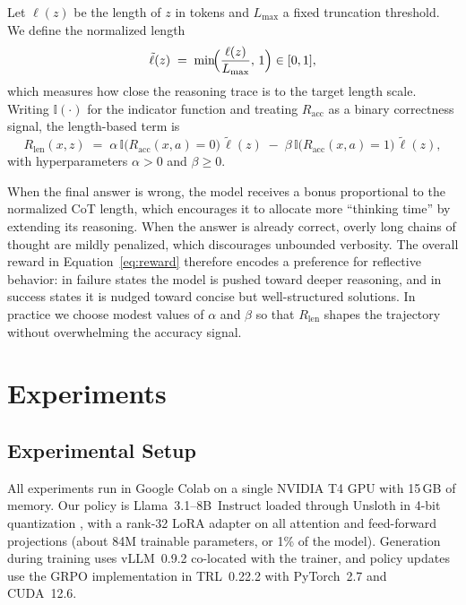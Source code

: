 \documentclass{article}
\begin{document}
Let $\ell(z)$ be the length of $z$ in tokens and $L_{\max}$ a fixed truncation threshold. We define the normalized length
\begin{equation}
    \tilde{\ell}(z) \;=\; \min\!\Bigl(\frac{\ell(z)}{L_{\max}},\, 1\Bigr) \in [0,1],
\end{equation}
which measures how close the reasoning trace is to the target length scale. Writing $\mathbb{I}(\cdot)$ for the indicator function and treating $R_{\text{acc}}$ as a binary correctness signal, the length-based term is
\begin{equation}
    R_{\text{len}}(x, z)
    \;=\;
    \alpha \, \mathbb{I}\!\bigl(R_{\text{acc}}(x,a) = 0\bigr)\, \tilde{\ell}(z)
    \;-\;
    \beta \, \mathbb{I}\!\bigl(R_{\text{acc}}(x,a) = 1\bigr)\, \tilde{\ell}(z),
\end{equation}
with hyperparameters $\alpha > 0$ and $\beta \ge 0$.

When the final answer is wrong, the model receives a bonus proportional to the normalized CoT length, which encourages it to allocate more ``thinking time'' by extending its reasoning. When the answer is already correct, overly long chains of thought are mildly penalized, which discourages unbounded verbosity. The overall reward in Equation~\ref{eq:reward} therefore encodes a preference for reflective behavior: in failure states the model is pushed toward deeper reasoning, and in success states it is nudged toward concise but well-structured solutions. In practice we choose modest values of $\alpha$ and $\beta$ so that $R_{\text{len}}$ shapes the trajectory without overwhelming the accuracy signal.

\section{Experiments}

\subsection{Experimental Setup}

All experiments run in Google Colab on a single NVIDIA T4 GPU with 15\,GB of memory. Our policy is Llama~3.1--8B~Instruct \cite{llama3} loaded through Unsloth \cite{unsloth} in 4-bit quantization \cite{dettmers2023qlora}, with a rank-32 LoRA adapter \cite{hu2022lora} on all attention and feed-forward projections (about 84M trainable parameters, or 1\% of the model). Generation during training uses vLLM~0.9.2 co-located with the trainer, and policy updates use the GRPO implementation in TRL~0.22.2 \cite{trl} with PyTorch~2.7 and CUDA~12.6.
\end{document}
